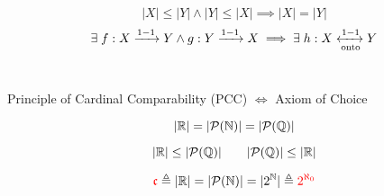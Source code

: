 \begin{frame}{}
  \begin{center}
    {\large {}}
  \end{center}

  \pause
  \vspace{0.30cm}
  \begin{theorem}
    \[
      |X| \le |Y| \land |Y| \le |X| \implies |X| = |Y|
    \]
    \pause
    \[
      \exists\; f: X \xrightarrow{1-1} Y \land g: Y \xrightarrow{1-1} X
      \implies \exists\; h: X \xleftrightarrow[\text{onto}]{1-1} Y
    \]
  \end{theorem}

  \pause
  \begin{columns}
      \pause
      \pause
      \vspace{-0.60cm}
      \begin{center}
        {\href{https://en.wikipedia.org/wiki/Schr\%C3\%B6der\%E2\%80\%93Bernstein\_theorem}{}}
      \end{center}
  \end{columns}
\end{frame}

\begin{frame}{}
  \begin{center}
    {\large {}}
  \end{center}

  \pause
  \vspace{0.50cm}
  \begin{theorem}[PCC]
    \begin{center}
      Principle of Cardinal Comparability (PCC) $\iff$ Axiom of Choice
    \end{center}
  \end{theorem}
\end{frame}

\begin{frame}{}
  \begin{theorem}[]
    \[
      |\mathbb{R}| = |\mathcal{P}(\mathbb{N})| = |\mathcal{P}(\mathbb{Q})|
    \]
  \end{theorem}

  \pause
  \[
    |\mathbb{R}| \le |\mathcal{P}(\mathbb{Q})|  \qquad |\mathcal{P}(\mathbb{Q})| \le |\mathbb{R}|
  \]
  \pause
  \begin{center}
  \end{center}

  \pause
  \[
    \textcolor{red}{\mathfrak{c}} \triangleq |\mathbb{R}| = |\mathcal{P}(\mathbb{N})| = |2^{\mathbb{N}}|
      \triangleq \textcolor{red}{2^{\aleph_{0}}}
  \]

  \pause
\end{frame}
